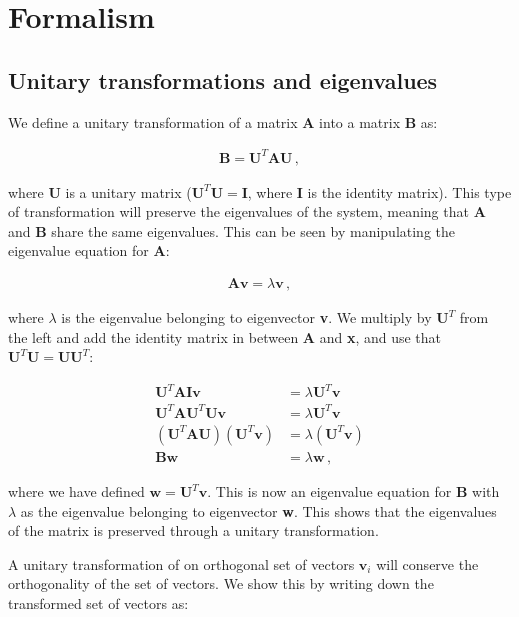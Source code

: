\documentclass[reprint,english,notitlepage]{revtex4-1}  %
\begin{document}
\section{Formalism} \label{sec:II}

\subsection{Unitary transformations and eigenvalues} \label{sec:II:a}

We define a unitary transformation of a matrix \textbf{A} into a matrix \textbf{B} as:

\begin{align*}
\textbf{B} = \textbf{U}^T \textbf{AU} \, ,
\end{align*}

where \textbf{U} is a unitary matrix ($\textbf{U}^T\textbf{U} = \textbf{I}$, where \textbf{I} is the identity matrix). This type of transformation will preserve the eigenvalues of the system, meaning that \textbf{A} and \textbf{B} share the same eigenvalues. This can be seen by manipulating the eigenvalue equation for \textbf{A}:

\begin{align*}
\textbf{A}\textbf{v} = \lambda \textbf{v} \, , 
\end{align*} 

where $\lambda$ is the eigenvalue belonging to eigenvector \textbf{v}. We multiply by $\textbf{U}^T$ from the left and add the identity matrix in between \textbf{A} and \textbf{x}, and use that $\textbf{U}^T \textbf{U} = \textbf{UU}^T$:

\begin{align*}
\textbf{U}^T \textbf{AIv} &= \lambda \textbf{U}^T \textbf{v} \\
\textbf{U}^T \textbf{AU}^T \textbf{Uv} &= \lambda \textbf{U}^T \textbf{v} \\
(\textbf{U}^T \textbf{AU} ) (\textbf{U}^T \textbf{v}) &= \lambda (\textbf{U}^T \textbf{v}) \\
\textbf{Bw} &= \lambda \textbf{w} \, ,
\end{align*}

where we have defined $\textbf{w} = \textbf{U}^T \textbf{v}$. This is now an eigenvalue equation for \textbf{B} with $\lambda$ as the eigenvalue belonging to eigenvector \textbf{w}. This shows that the eigenvalues of the matrix is preserved through a unitary transformation.

A unitary transformation of on orthogonal set of vectors $\textbf{v}_i$ will conserve the orthogonality of the set of vectors. We show this by writing down the transformed set of vectors as:
\end{document}
